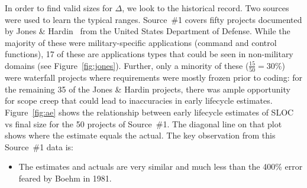 \documentclass[final,twocolumn,5p]{elsarticle}
\newcommand{\bi}{\begin{itemize}[leftmargin=0.4cm]}
\newcommand{\ei}{\end{itemize}}
\newcommand{\fig}[1]{Figure~\ref{fig:#1}}
\theoremstyle{break}
\begin{document}
In order to find valid sizes for $\Delta$, we look to the historical record. 
Two sources were used to learn the typical ranges. Source~\#1 covers fifty projects documented
by Jones \& Hardin~\cite{jones07a} from the United
States Department of Defense.
  While the majority of
these were military-specific applications (command
and control functions), 17 of these are applications
types that could be seen in non-military domains
(see \fig{jones}).
  Further, only a minority of
these ($\frac{15}{50}=30\%$) were waterfall
projects where requirements were mostly frozen prior
to coding: for the remaining 35 of the Jones \& Hardin projects, there was ample opportunity
for scope creep that could lead to inaccuracies in early lifecycle estimates.
\fig{ae} shows the relationship between early lifecycle estimates of SLOC vs final size for the 50
projects of Source~\#1. The diagonal line on that plot shows where the estimate equals the actual.
The key observation from this Source~\#1 data is:
\bi
\item The estimates and actuals are very similar and much less than the 400\% error feared by Boehm in 1981.
  \ei 
\end{document}
